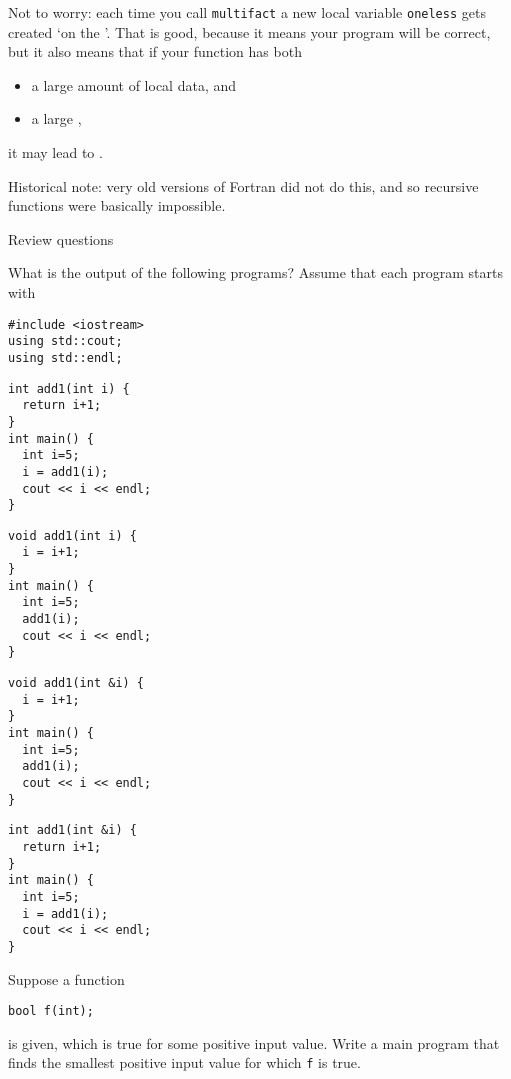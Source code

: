 Not to worry: each time you call \lstinline{multifact} a new local variable
\lstinline{oneless} gets created `on the '.
That is good, because it means your program
will be correct, but it also means that if your function has both
\begin{itemize}
\item a large amount of local data, and
\item a large ,
\end{itemize}
it may lead to .

\begin{remark}
  Historical note: very old versions of Fortran
  did not do this, and so recursive functions were basically
  impossible.
\end{remark}

 {Review questions}

\begin{review}
  What is the output of the following programs?
  Assume that each program starts with
\begin{lstlisting}
#include <iostream>
using std::cout;
using std::endl;
\end{lstlisting}

  \begin{multicols}{2}
\begin{lstlisting}
int add1(int i) {
  return i+1;
}
int main() {
  int i=5;
  i = add1(i);
  cout << i << endl;
}
\end{lstlisting}
\columnbreak
\begin{lstlisting}
void add1(int i) {
  i = i+1;
}
int main() {
  int i=5;
  add1(i);
  cout << i << endl;
}
\end{lstlisting}
  \end{multicols}

  \begin{multicols}{2}
\begin{lstlisting}
void add1(int &i) {
  i = i+1;
}
int main() {
  int i=5;
  add1(i);
  cout << i << endl;
}
\end{lstlisting}
\columnbreak
\begin{lstlisting}
int add1(int &i) {
  return i+1;
}
int main() {
  int i=5;
  i = add1(i);
  cout << i << endl;
}
\end{lstlisting}
  \end{multicols}
\end{review}

\begin{review}
  \label{ex:cpp-funcloop1}
  Suppose a function
\begin{lstlisting}
bool f(int);
\end{lstlisting}
is given, which is true for some positive input value. Write a main program that
finds the smallest positive input value for which \lstinline{f} is true.
\end{review}


